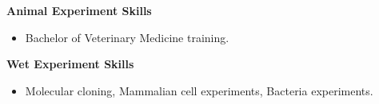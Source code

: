 
\textbf{Animal Experiment Skills}

\begin{itemize}
    \item Bachelor of Veterinary Medicine training.
\end{itemize}


\textbf{Wet Experiment Skills}
\begin{itemize}
    \item Molecular cloning, Mammalian cell experiments, Bacteria experiments.
\end{itemize}
  



  
